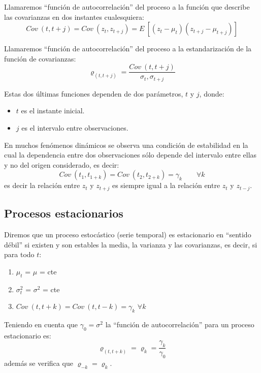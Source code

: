 \begin{definicion}\label{def:fdeautocovarianzas}
Llamaremos ``funci\'on de autocorrelaci\'on'' del proceso a la funci\'on que
describe las covarianzas en dos instantes cualesquiera:
\begin{displaymath}
Cov\ (t,t+j)=Cov\ (z_t,z_{t+j}) = E\ [(z_t-\mu_t)(z_{t+j}-\mu_{t+j})]
\end{displaymath}
\end{definicion}

\begin{definicion}\label{def:fdeautocorrelacion}
Llamaremos ``funci\'on de autocorrelaci\'on'' del proceso a la estandarizaci\'on
de la funci\'on de covarianzas:
\begin{displaymath}
\varrho_{(t,t+j)}=\frac{Cov\ (t,t+j)}{\sigma_t,\sigma_{t+j}}
\end{displaymath}
\end{definicion}
%
Estas dos \'ultimas funciones dependen de dos par\'ametros, $t$ y $j$, donde:
\begin{itemize}
\item $t$ es el instante inicial.
\item $j$ es el intervalo entre observaciones.
\end{itemize}
%
En muchos fen\'omenos din\'amicos se observa una condici\'on de estabilidad en
la cual la dependencia entre dos observaciones s\'olo depende del intervalo
entre ellas y no del origen considerado, es decir:
\begin{displaymath}
Cov\ (t_1,t_{1+k})=Cov\ (t_2,t_{2+k}) = \gamma_k\qquad \forall k
\end{displaymath}
es decir la relaci\'on entre $z_t$ y $z_{t+j}$ es siempre igual a la relaci\'on
entre $z_t$ y $z_{t-j}$.

\subsection{Procesos estacionarios}

Diremos que un proceso estoc\'astico (serie temporal) es estacionario en
``sentido d\'ebil'' si existen y son estables la media, la varianza y las
covarianzas, es decir, si para todo $t$:
\begin{enumerate}
\item $\mu_t$ = $\mu$ = cte
\item $\sigma^2_t$ = $\sigma^2$ = cte
\item $Cov\ (t,t+k)=Cov\ (t,t-k)=\gamma_k$ $\forall k$
\end{enumerate}
%
Teniendo en cuenta que $\gamma_0=\sigma^2$ la ``funci\'on de autocorrelaci\'on''
para un proceso estacionario es:
\begin{displaymath}
\varrho_{(t,t+k)} = \varrho_k = \frac{\gamma_k}{\gamma_0}
\end{displaymath}
adem\'as se verifica que $\varrho_{-k}=\varrho_{k}$.\\


